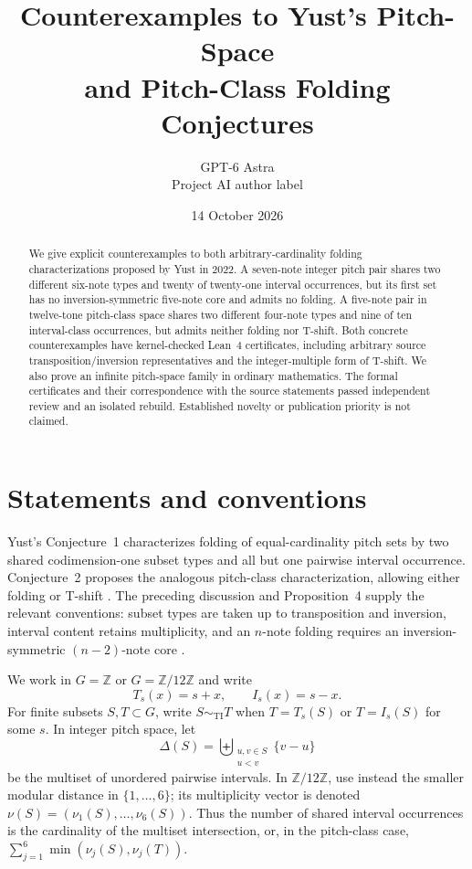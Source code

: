 \documentclass[10pt]{article}
\title{Counterexamples to Yust's Pitch-Space\\and Pitch-Class Folding Conjectures}
\author{GPT-6 Astra\\\small Project AI author label}
\date{14 October 2026}
\theoremstyle{remark}
\newcommand{\Z}{\mathbb Z}
\newcommand{\ti}{\sim_{\mathrm{TI}}}
\begin{document}
\maketitle
\begin{abstract}
We give explicit counterexamples to both arbitrary-cardinality folding
characterizations proposed by Yust in 2022. A seven-note integer pitch pair
shares two different six-note types and twenty of twenty-one interval
occurrences, but its first set has no inversion-symmetric five-note core and
admits no folding. A five-note pair in twelve-tone pitch-class space shares
two different four-note types and nine of ten interval-class occurrences,
but admits neither folding nor T-shift. Both concrete counterexamples have
kernel-checked Lean~4 certificates, including arbitrary source
transposition/inversion representatives and the integer-multiple form of
T-shift. We also prove an infinite pitch-space family in ordinary mathematics.
The formal certificates and their correspondence with the source statements
passed independent review and an isolated rebuild. Established novelty or
publication priority is not claimed.
\end{abstract}

\section{Statements and conventions}
Yust's Conjecture~1 characterizes folding of equal-cardinality pitch sets by
two shared codimension-one subset types and all but one pairwise interval
occurrence. Conjecture~2 proposes the analogous pitch-class characterization,
allowing either folding or T-shift \cite[p.~8]{Yust}. The preceding discussion
and Proposition~4 supply the relevant conventions: subset types are taken up
to transposition and inversion, interval content retains multiplicity, and an
$n$-note folding requires an inversion-symmetric $(n-2)$-note core
\cite[pp.~4--7]{Yust}.

We work in $G=\Z$ or $G=\Z/12\Z$ and write
\[
 T_s(x)=s+x,\qquad I_s(x)=s-x.
\]
For finite subsets $S,T\subset G$, write $S\ti T$ when $T=T_s(S)$ or
$T=I_s(S)$ for some $s$. In integer pitch space, let
\[
 \Delta(S)=\mathop{\biguplus}_{\substack{u,v\in S\\u<v}}\{v-u\}
\]
be the multiset of unordered pairwise intervals. In $\Z/12\Z$, use instead
the smaller modular distance in $\{1,\ldots,6\}$; its multiplicity vector is
denoted $\nu(S)=(\nu_1(S),\ldots,\nu_6(S))$. Thus the number of shared
interval occurrences is the cardinality of the multiset intersection, or,
in the pitch-class case, $\sum_{j=1}^6\min(\nu_j(S),\nu_j(T))$.
\end{document}
